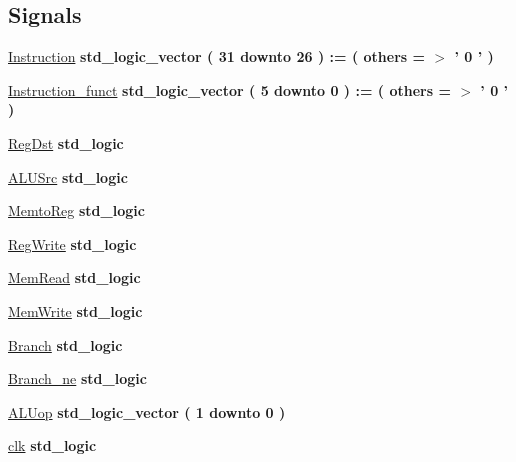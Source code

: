 \subsection*{\-Signals}
 \begin{DoxyCompactItemize}
\item 
\hyperlink{class_control__tb_1_1behavior_a267183c3a03a45e4243b452ca4cefae2}{\-Instruction} {\bfseries std\-\_\-logic\-\_\-vector (   31    downto    26  )  \-:= (  others  = $>$ '  0  '  ) } 
\item 
\hyperlink{class_control__tb_1_1behavior_ac4ce8a186b2ce0f689f6fdf434645e8e}{\-Instruction\-\_\-funct} {\bfseries std\-\_\-logic\-\_\-vector (   5    downto    0  )  \-:= (  others  = $>$ '  0  '  ) } 
\item 
\hyperlink{class_control__tb_1_1behavior_a67c79ca7ea14c50e7b88a92767b7e398}{\-Reg\-Dst} {\bfseries std\-\_\-logic } 
\item 
\hyperlink{class_control__tb_1_1behavior_aecd39ff4850f70b5620d77a1db86c10e}{\-A\-L\-U\-Src} {\bfseries std\-\_\-logic } 
\item 
\hyperlink{class_control__tb_1_1behavior_a3de014118e9468b5db1181389cd797c1}{\-Memto\-Reg} {\bfseries std\-\_\-logic } 
\item 
\hyperlink{class_control__tb_1_1behavior_a66398331a595943cc4ff1b585dbe24d9}{\-Reg\-Write} {\bfseries std\-\_\-logic } 
\item 
\hyperlink{class_control__tb_1_1behavior_a4bc7da8557faafacddfb56cb3c3f0d73}{\-Mem\-Read} {\bfseries std\-\_\-logic } 
\item 
\hyperlink{class_control__tb_1_1behavior_a8191975b14650422c32525035071f4a1}{\-Mem\-Write} {\bfseries std\-\_\-logic } 
\item 
\hyperlink{class_control__tb_1_1behavior_a05b8fd1d32e431ac9f7ee10d7c94456b}{\-Branch} {\bfseries std\-\_\-logic } 
\item 
\hyperlink{class_control__tb_1_1behavior_a43ed234a1ae58140bfdfd216edc7e186}{\-Branch\-\_\-ne} {\bfseries std\-\_\-logic } 
\item 
\hyperlink{class_control__tb_1_1behavior_a5d65420da74b0a0059c439bac3a8a4e8}{\-A\-L\-Uop} {\bfseries std\-\_\-logic\-\_\-vector (   1    downto    0  ) } 
\item 
\hyperlink{class_control__tb_1_1behavior_aca7354d71943883837f9a10b804a321f}{clk} {\bfseries std\-\_\-logic } 
\end{DoxyCompactItemize}


